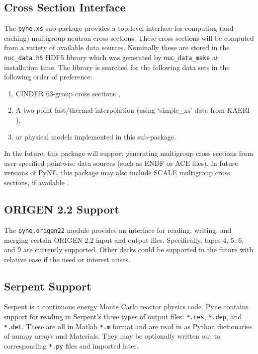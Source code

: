 \documentclass{anstrans}
\begin{document}
\subsection{Cross Section Interface} 
The \texttt{pyne.xs} sub-package provides a top-level interface for computing 
(and caching) multigroup neutron cross sections. These cross sections will be 
computed from a variety of available data sources.  Nominally these are stored 
in the \texttt{nuc\_data.h5} HDF5 library which was generated by \texttt{nuc\_data\_make}
at installation time.  The library is searched for the following data sets in the 
following order of preference: 

\begin{enumerate}
    \item CINDER 63-group cross sections \cite{cinder},
    \item A two-point fast/thermal interpolation (using `simple\_xs' data from KAERI \cite{kaeri}),
    \item or physical models implemented in this sub-package.
\end{enumerate}

In the future, this package will support generating multigroup cross sections 
from user-specified pointwise data sources (such as ENDF or ACE files).  In future 
versions of PyNE, this 
package may also include SCALE multigroup cross sections, if available \cite{scale}.


\subsection{ORIGEN 2.2 Support}
The \texttt{pyne.origen22} module provides an interface for reading, writing, and 
merging certain ORIGEN 2.2 \cite{origen} input and output files.  Specifically, 
tapes 4, 5, 6, and 9 are currently supported.  Other decks could be supported in 
the future with relative ease if the need or interest arises.


\subsection{Serpent Support} 
Serpent \cite{serpent} is a continuous energy Monte Carlo reactor physics code.  
Pyne contains support for reading in Serpent's three types of output files: 
\texttt{*.res}, \texttt{*.dep}, and \texttt{*.det}.  These are all in Matlab 
\texttt{*.m} format and are read in 
as Python dictionaries of numpy arrays and Materials.  They may be optionally 
written out to corresponding \texttt{*.py} files and imported later.
\end{document}
